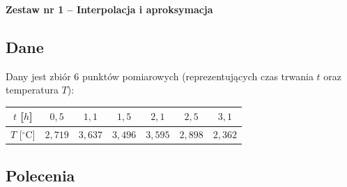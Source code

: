 \documentclass[a4paper,11pt]{article}
\begin{document}
\begin{center}
  {\large\bfseries Zestaw nr 1 \quad -- \quad Interpolacja i aproksymacja}
\end{center}
\hrulefill
\vspace{0.4cm}

\subsection*{Dane}

Dany jest zbiór 6 punktów pomiarowych (reprezentujących czas trwania $t$ oraz temperatura $T$):

\begin{center}
\begin{tabular}{c|cccccc}
  \toprule
  $t$ [$h$] & $0{,}5$ & $1{,}1$ & $1{,}5$ & $2{,}1$ & $2{,}5$ & $3{,}1$ \\
  \midrule
  $T$ [$^\circ\text{C}$] & $2{,}719$ & $3{,}637$ & $3{,}496$ & $3{,}595$ & $2{,}898$ & $2{,}362$ \\
  \bottomrule
\end{tabular}
\end{center}

\subsection*{Polecenia}
\end{document}
